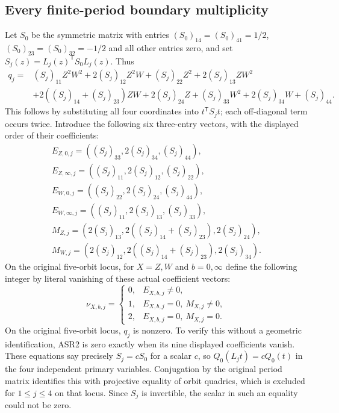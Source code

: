\documentclass[11pt,a4paper]{article}
\begin{document}
\subsection{Every finite-period boundary multiplicity}
Let $S_0$ be the symmetric matrix with entries
$(S_0)_{14}=(S_0)_{41}=1/2$,
$(S_0)_{23}=(S_0)_{32}=-1/2$ and all other entries zero, and set
$S_j(z)=L_j(z)^{\mathsf T}S_0L_j(z)$. Thus
\[
\begin{split}
 q_j={}&(S_j)_{11}Z^2W^2+2(S_j)_{12}Z^2W+(S_j)_{22}Z^2
       +2(S_j)_{13}ZW^2\\
 &+2((S_j)_{14}+(S_j)_{23})ZW+2(S_j)_{24}Z
       +(S_j)_{33}W^2+2(S_j)_{34}W+(S_j)_{44}.
\end{split}\tag{ASR2}
\]
This follows by substituting all four coordinates into $t^{\mathsf T}S_jt$;
each off-diagonal term occurs twice. Introduce the following six
three-entry vectors, with the displayed order of their coefficients:
\[
\begin{gathered}
 E_{Z,0,j}=((S_j)_{33},2(S_j)_{34},(S_j)_{44}),\\
 E_{Z,\infty,j}=((S_j)_{11},2(S_j)_{12},(S_j)_{22}),\\
 E_{W,0,j}=((S_j)_{22},2(S_j)_{24},(S_j)_{44}),\\
 E_{W,\infty,j}=((S_j)_{11},2(S_j)_{13},(S_j)_{33}),\\
 M_{Z,j}=(2(S_j)_{13},2((S_j)_{14}+(S_j)_{23}),2(S_j)_{24}),\\
 M_{W,j}=(2(S_j)_{12},2((S_j)_{14}+(S_j)_{23}),2(S_j)_{34}).
\end{gathered}\tag{ASR3}
\]
On the original five-orbit locus, for $X=Z,W$ and $b=0,\infty$
define the following integer by
literal vanishing of these actual coefficient vectors:
\[
 \nu_{X,b,j}=
 \begin{cases}
 0,&E_{X,b,j}\ne0,\\
 1,&E_{X,b,j}=0,\ M_{X,j}\ne0,\\
 2,&E_{X,b,j}=0,\ M_{X,j}=0.
 \end{cases}
 \tag{ASR4}
\]
On the original five-orbit locus, $q_j$ is nonzero. To verify this
without a geometric identification, ASR2 is zero exactly when its
nine displayed coefficients vanish. These equations say precisely
$S_j=cS_0$ for a scalar $c$, so $Q_0(L_jt)=cQ_0(t)$ in the four
independent primary variables. Conjugation by the original period
matrix identifies this with projective equality of orbit quadrics,
which is excluded for $1\le j\le4$ on that locus. Since $S_j$
is invertible, the scalar in such an equality could not be zero.
\end{document}

